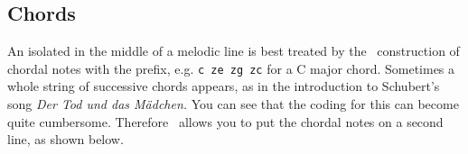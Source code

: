 \documentclass[11pt]{article}
\begin{document}
\subsection{Chords}  \label{chords}

An isolated  in the middle of a melodic line is best treated
by the \PMX\ construction of chordal notes with the  prefix, e.g.
\verb"c ze zg zc" 
for a C major chord.  Sometimes a whole string of successive chords appears,
as in the introduction to Schubert's song \textit{Der Tod und das M\"adchen.}
You can see that the coding for this can become quite cumbersome.
Therefore \MTx\ allows you to put the chordal notes on a second line,
as shown below.  

\hskip -18mm
\begin{mus}

\end{mus}
\vskip 12pt

\end{document}
